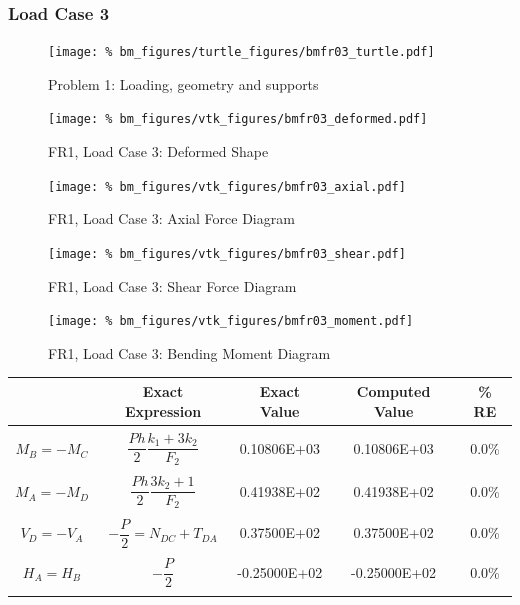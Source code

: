 %
%
\clearpage
\subsubsection{Load Case 3}
\begin{figure}[h]
    \texttt{[image: \%
                            bm\_figures/turtle\_figures/bmfr03\_turtle.pdf]}
    \centering
    \caption{Problem 1: Loading, geometry and supports}
    \label{fig:bmfr03_turtle}
\end{figure}


\begin{figure}[!htb]
    \texttt{[image: \%
                     bm\_figures/vtk\_figures/bmfr03\_deformed.pdf]}
    \centering
    \caption{FR1, Load Case 3: Deformed Shape}
    \label{fig:bmfr03_deformed}
\end{figure}
\begin{figure}[!htb]
    \texttt{[image: \%
                     bm\_figures/vtk\_figures/bmfr03\_axial.pdf]}
    \centering
    \caption{FR1, Load Case 3: Axial Force Diagram}
    \label{fig:bmfr03_shear}
\end{figure}
\begin{figure}[!htb]
    \texttt{[image: \%
                     bm\_figures/vtk\_figures/bmfr03\_shear.pdf]}
    \centering
    \caption{FR1, Load Case 3: Shear Force Diagram}
    \label{fig:bmfr03_shear}
\end{figure}
\begin{figure}[!htb]
    \texttt{[image: \%
                     bm\_figures/vtk\_figures/bmfr03\_moment.pdf]}
    \centering
    \caption{FR1, Load Case 3: Bending Moment Diagram}
    \label{fig:bmfr03_moment}
\end{figure}
\begin{table}[h!]
\centering
\begin{tabular}{ c| c c c c }
    & Exact Expression & Exact Value & Computed Value & \% RE \\ \hline \\
    $M_B=-M_C$   & $\dfrac{Ph}{2}\dfrac{k_1+3k_2}{F_2}$ & 0.10806E+03 & 0.10806E+03 & 0.0\% \\ \\
    $M_A=-M_D$   & $\dfrac{Ph}{2}\dfrac{3k_2+1}{F_2}$ &  0.41938E+02 & 0.41938E+02 & 0.0\% \\ \\
    $V_D=-V_A$   & $-\dfrac{P}{2}=N_{DC} + T_{DA}$ &  0.37500E+02 & 0.37500E+02 & 0.0\% \\ \\
    $H_A=H_B$    & $-\dfrac{P}{2} $ &  -0.25000E+02 & -0.25000E+02 & 0.0\% \\ \\
\end{tabular}
\end{table}

